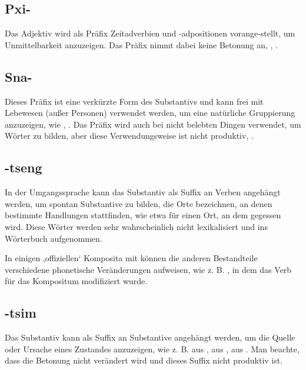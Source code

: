 \subsection{Pxi-} Das Adjektiv   wird als Präfix Zeitadverbien und -adpositionen vorange-stellt, um Unmittelbarkeit anzuzeigen. Das Präfix nimmt dabei keine Betonung an,  ,  .

\subsection{Sna-} Dieses Präfix ist eine verkürzte Form des Substantivs   und kann frei mit Lebewesen (außer Personen) verwendet werden, um eine natürliche Gruppierung anzuzeigen, wie  ,  .
Das Präfix wird auch bei nicht belebten Dingen verwendet, um Wörter zu bilden, aber diese Verwendungsweise ist nicht produktiv,  .

\subsection{-tseng} In der Umgangssprache kann das Substantiv   als Suffix an Verben angehängt werden, um spontan Substantive zu bilden, die Orte bezeichnen, an denen bestimmte Handlungen stattfinden, wie etwa  für einen Ort, an dem gegessen wird. Diese Wörter werden sehr wahrscheinlich nicht lexikalisiert und ins Wörterbuch aufgenommen.

In einigen ,offiziellen‘ Komposita mit  können die anderen Bestandteile verschiedene phonetische Veränderungen aufweisen, wie z. B.  , in dem das Verb  für das Kompositum modifiziert wurde.

\subsection{-tsim} Das Substantiv   kann als Suffix an Substantive angehängt werden, um die Quelle oder Ursache eines Zustandes anzuzeigen, wie z. B.   aus  ,   aus  ,   aus  . Man beachte, dass die Betonung nicht verändert wird und dieses Suffix nicht produktiv ist.

